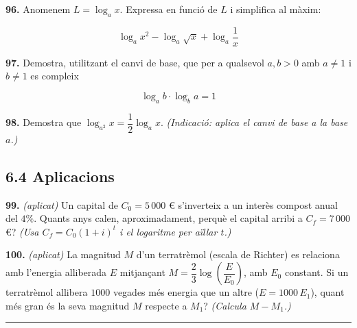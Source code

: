 \documentclass[13pt,a4paper]{extarticle}
\begin{document}
\par\noindent\begin{minipage}{\linewidth}
\textbf{96.} Anomenem $L=\log_a x$. Expressa en funció de $L$ i simplifica al màxim:\par

$$\log_a x^2-\log_a \sqrt{x}+\log_a \dfrac{1}{x}$$\par
\end{minipage}\par\vspace{1.6mm}
\par\noindent\begin{minipage}{\linewidth}
\textbf{97.} Demostra, utilitzant el canvi de base, que per a qualsevol $a,b>0$ amb $a\neq1$ i $b\neq1$ es compleix\par

$$\log_a b \cdot \log_b a = 1$$\par
\end{minipage}\par\vspace{1.6mm}
\par\noindent\begin{minipage}{\linewidth}
\textbf{98.} Demostra que $\log_{a^2} x = \dfrac12 \log_a x$. \emph{(Indicació: aplica el canvi de base a la base $a$.)}\par
\end{minipage}\par\vspace{1.6mm}
\subsection*{6.4 Aplicacions}

\par\noindent\begin{minipage}{\linewidth}
\textbf{99.} \emph{(aplicat)} Un capital de $C_0=5\,000$ \euro{} s'inverteix a un interès compost anual del $4\%$. Quants anys calen, aproximadament, perquè el capital arribi a $C_f=7\,000$ \euro{}? \emph{(Usa $C_f=C_0\left(1+i\right)^t$ i el logaritme per aïllar $t$.)}\par
\end{minipage}\par\vspace{1.6mm}
\par\noindent\begin{minipage}{\linewidth}
\textbf{100.} \emph{(aplicat)} La magnitud $M$ d'un terratrèmol (escala de Richter) es relaciona amb l'energia alliberada $E$ mitjançant $M=\dfrac{2}{3}\log\left(\dfrac{E}{E_0}\right)$, amb $E_0$ constant. Si un terratrèmol allibera $1000$ vegades més energia que un altre ($E=1000\,E_1$), quant més gran és la seva magnitud $M$ respecte a $M_1$? \emph{(Calcula $M-M_1$.)}\par
\end{minipage}\par\vspace{1.6mm}
\vspace{1mm}\hrule\vspace{3mm}
\end{document}
